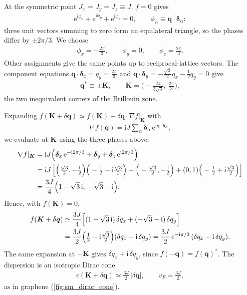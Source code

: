 \documentclass[
  aps,
  prl,
  preprint,
  amsmath,
  amssymb,
  superscriptaddress,
  floatfix
]{revtex4-2}
\newcommand{\ii}{\mathrm{i}}
\newcommand{\ee}{\mathrm{e}}
\renewcommand{\abs}[1]{\left| #1 \right|}
\begin{document}
At the symmetric point $J_x=J_y=J_z\equiv J$, $f=0$ gives 
\begin{align}
  \ee^{\ii\phi_x}+\ee^{\ii\phi_y}+\ee^{\ii\phi_z}=0,
  \qquad \phi_\alpha \equiv \bm q\cdot\bm\delta_\alpha :
\end{align}
three unit vectors summing to zero form an equilateral triangle, so the
phases differ by $\pm2\pi/3$. We choose
\begin{align}
  \phi_x=-\tfrac{2\pi}{3},\qquad \phi_y=0,\qquad \phi_z=\tfrac{2\pi}{3} .
\end{align}
Other assignments give the same points up to reciprocal-lattice vectors.
The component equations $\bm q\cdot\bm\delta_z=q_y=\tfrac{2\pi}{3}$ and
$\bm q\cdot\bm\delta_y=-\tfrac{\sqrt3}{2}q_x-\tfrac12 q_y=0$ give
\begin{align}
  \bm q^* \equiv \pm\bm K,
  \qquad
  \bm K = \Big(-\frac{2\pi}{3\sqrt3},\ \frac{2\pi}{3}\Big),
\end{align}
the two inequivalent corners of the Brillouin zone.

Expanding $f(\bm K+\delta\bm q)\simeq f(\bm K)+\delta\bm q\cdot\nabla
f|_{\bm K}$ with
\begin{align}
  \nabla f(\bm q) = \ii J \sum_\alpha \bm\delta_\alpha\, \ee^{\ii \bm q\cdot\bm\delta_\alpha},
\end{align}
we evaluate at $\bm K$ using the three phases above:
\begin{align}
  \nabla f|_{\bm K}
  &= \ii J\Big(\bm\delta_x\, \ee^{-\ii 2\pi/3} + \bm\delta_y + \bm\delta_z\, \ee^{\ii 2\pi/3}\Big) \notag\\
  &= \ii J \left[ \Big(\tfrac{\sqrt3}{2},-\tfrac12\Big)\Big(-\tfrac12-\ii\tfrac{\sqrt3}{2}\Big)
     + \Big(-\tfrac{\sqrt3}{2},-\tfrac12\Big)
     + (0,1)\Big(-\tfrac12+\ii\tfrac{\sqrt3}{2}\Big)\right] \notag\\
  &= \frac{3J}{4}\Big(1-\sqrt3\,\ii,\ -\sqrt3-\ii\Big).
\end{align}
Hence, with $f(\bm K)=0$,
\begin{align}
  f(\bm K+\delta\bm q)
  &\simeq \frac{3J}{4}\Big[(1-\sqrt3\,\ii)\,\delta q_x + (-\sqrt3-\ii)\,\delta q_y\Big] \notag\\
  &= \frac{3J}{2}\Big(\tfrac12-\ii\tfrac{\sqrt3}{2}\Big)(\delta q_x-\ii\,\delta q_y)
  = \frac{3J}{2}\, \ee^{-\ii\pi/3}\, (\delta q_x - \ii\,\delta q_y).
  \label{eq:sm_linearization}
\end{align}
The same expansion at $-\bm K$ gives $\delta q_x+\ii\,\delta
q_y$, since $f(-\bm q)=f(\bm q)^*$. The dispersion is an isotropic Dirac
cone
\begin{align}
  \epsilon(\bm K+\delta\bm q) \simeq \frac{3J}{2}\,\abs{\delta\bm q},
  \qquad v_F=\frac{3J}{2},
\end{align}
as in graphene (\cref{fig:sm_dirac_cone}).
\end{document}
